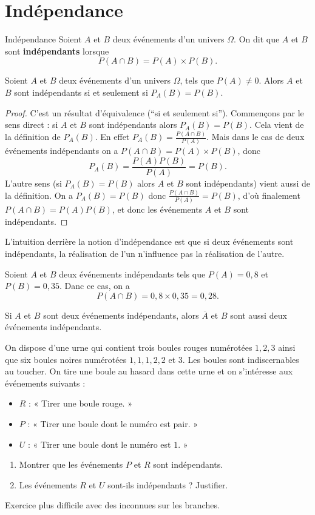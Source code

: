 \documentclass[11pt]{article}
\begin{document}
\section{Indépendance}
\begin{defi}{Indépendance}
  Soient $A$ et $B$ deux événements d'un univers $\Omega$. On dit que $A$ et $B$
  sont \textbf{indépendants} lorsque
  \[
    P(A\cap B) = P(A)\times P(B).
  \]
\end{defi}
\begin{prop}
  Soient $A$ et $B$ deux événements d'un univers $\Omega$, tels que $P(A)\neq0$.
  Alors $A$ et $B$ sont indépendants si et seulement si $P_A(B)=P(B)$.
\end{prop}
\begin{proof}
  C'est un résultat d'équivalence (``si et seulement si''). Commençons par le
  sens direct : si $A$ et $B$ sont indépendants alors $P_A(B)=P(B)$. Cela vient de la définition de $P_A(B)$. En effet $P_A(B)=\frac{P(A\cap
  B)}{P(A)}$. Mais dans le cas de deux événements indépendants on a
  $P(A\cap B)=P(A)\times P(B)$, donc
  \[
    P_A(B)=\frac{P(A)P(B)}{P(A)}=P(B).
  \]
  L'autre sens (si $P_A(B)=P(B)$ alors $A$ et $B$ sont indépendants) vient aussi
  de la définition. On a $P_A(B)=P(B)$ donc $\frac{P(A\cap B)}{P(A)}=P(B)$, d'où
  finalement $P(A\cap B)=P(A)P(B)$, et donc les événements $A$ et $B$ sont
  indépendants.
\end{proof}
\begin{rmq}
  L'intuition derrière la notion d'indépendance est que si deux événements sont
  indépendants, la réalisation de l'un n'influence pas la réalisation
  de l'autre.
\end{rmq}
\begin{exemple}
  Soient $A$ et $B$ deux événements indépendants tels que $P(A)=0,8$ et
  $P(B)=0,35$. Danc ce cas, on a
  \[
    P(A\cap B) = 0,8\times0,35=0,28.
  \]
\end{exemple}
\begin{propadm}
  Si $A$ et $B$ sont deux événements indépendants, alors $\overline A$ et $B$
  sont aussi deux événements indépendants.
\end{propadm}
\begin{app}
  On dispose d'une urne qui contient trois boules rouges numérotées $1, 2, 3$
  ainsi que six boules noires numérotées $1, 1, 1, 2, 2$ et $3$. Les boules sont
  indiscernables au toucher. On tire une boule au hasard dans cette urne et on
  s'intéresse aux événements suivants :
  \begin{itemize}
    \item $R$ : « Tirer une boule rouge. »
    \item $P$ : « Tirer une boule dont le numéro est pair. »
    \item $U$ : « Tirer une boule dont le numéro est $1$. »
  \end{itemize}
  \begin{enumerate}
    \item Montrer que les événements $P$ et $R$ sont indépendants.
    \item Les événements $R$ et $U$ sont-ils indépendants ? Justifier.
  \end{enumerate}
\end{app}

\begin{app}
  Exercice plus difficile avec des inconnues sur les branches.
\end{app}
\end{document}
